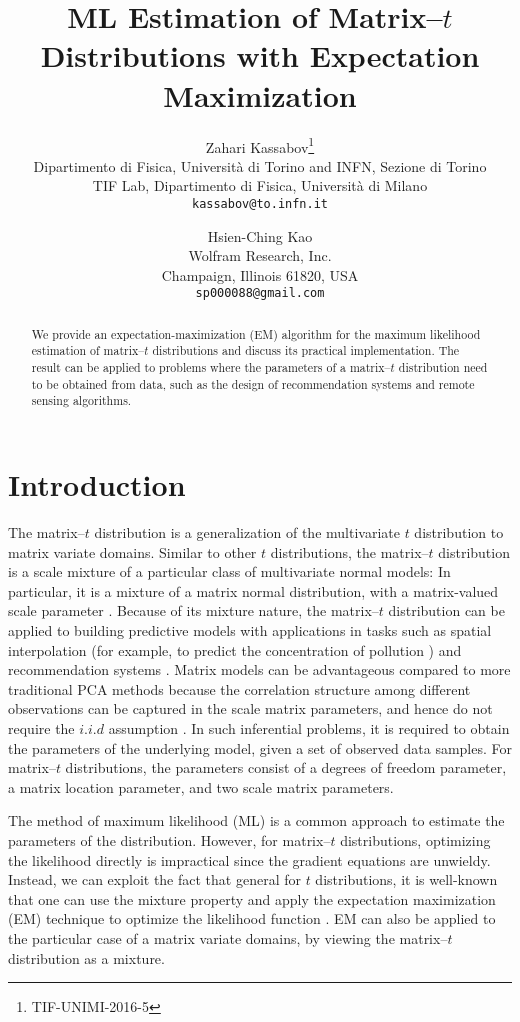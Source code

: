 \documentclass[english,listof=totoc]{scrartcl}
\title{ML Estimation of Matrix--$t$ Distributions with Expectation Maximization}
\author{Zahari Kassabov\thanks{TIF-UNIMI-2016-5}\\
        Dipartimento di Fisica, Universit\`a di Torino and INFN, Sezione di Torino\\
		TIF Lab, Dipartimento di Fisica, Universit\`a di Milano\\
        \texttt{kassabov@to.infn.it}\\
        \and
        Hsien-Ching Kao\\
        Wolfram Research, Inc.\\
		Champaign, Illinois 61820, USA\\
		\texttt{sp000088@gmail.com}
		}
\begin{document}
\maketitle

\begin{abstract}
We provide an expectation-maximization (EM) algorithm for the maximum
likelihood estimation of matrix--$t$ distributions and discuss its
practical implementation. The result can be applied to problems where
the parameters of a matrix--$t$ distribution need to be obtained from
data, such as the design of recommendation systems and remote sensing
algorithms.
\end{abstract}

\section{Introduction}
The matrix--$t$ distribution is a generalization of the multivariate
$t$ distribution to matrix variate domains. Similar to other $t$
distributions, the matrix--$t$ distribution is a scale mixture of
a particular class of multivariate normal models: In particular, it is
a mixture of a matrix normal distribution, with a matrix-valued scale
parameter \citep{gupta1999matrix}.  Because of its mixture nature, the
matrix--$t$ distribution can be applied to building predictive models
with applications in tasks such as  spatial interpolation (for
example, to predict the concentration of pollution
\citep{KIBRIA2006785}) and recommendation systems
\citep{NIPS2007_3203}. Matrix models can be advantageous compared to
more traditional PCA methods because the correlation structure among
different observations can be captured in the scale matrix parameters,
and hence do not require the $i.i.d$ assumption
\citep{2013arXiv1309.6609G}. In such inferential problems, it is
required to obtain the parameters of the underlying model, given a set
of observed data samples. For matrix--$t$ distributions, the
parameters consist of a degrees of freedom parameter, a matrix
location parameter, and two scale matrix parameters.

The method of maximum likelihood (ML) is a common approach to estimate
the parameters of the distribution. However, for matrix--$t$
distributions, optimizing the likelihood directly is impractical since
the gradient equations are unwieldy. Instead, we can exploit the fact
that general for $t$ distributions, it is well-known that one can use
the mixture property and apply the expectation maximization (EM)
technique to optimize the likelihood function
\citep{10.2307/24305551}. EM can also be  applied to the particular
case of a matrix variate domains, by viewing the matrix--$t$
distribution as a mixture.
\end{document}
